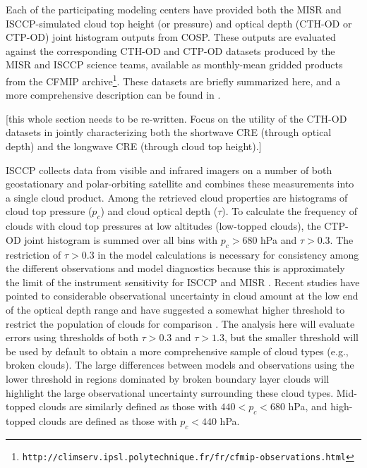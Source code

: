 Each of the participating modeling centers have provided both the MISR and ISCCP-simulated cloud top height (or pressure) and optical depth (CTH-OD or CTP-OD) joint histogram outputs from COSP. These outputs are evaluated against the corresponding CTH-OD and CTP-OD datasets produced by the MISR and ISCCP science teams, available as monthly-mean gridded products from the CFMIP archive\footnote{\tt http://climserv.ipsl.polytechnique.fr/fr/cfmip-observations.html}. These datasets are briefly summarized here, and a more comprehensive description can be found in \cite{marchand_et_al_2010}.

[this whole section needs to be re-written. Focus on the utility of the CTH-OD datasets in jointly characterizing both the shortwave CRE (through optical depth) and the longwave CRE (through cloud top height).]

ISCCP collects data from visible and infrared imagers on a number of both geostationary and polar-orbiting satellite and combines these measurements into a single cloud product. Among the retrieved cloud properties are histograms of cloud top pressure ($p_c$) and cloud optical depth ($\tau$). To calculate the frequency of clouds with cloud top pressures at low altitudes (low-topped clouds), the CTP-OD joint histogram is summed over all bins with $p_c > 680$ hPa and $\tau > 0.3$. The restriction of $\tau > 0.3$ in the model calculations is necessary for consistency among the different observations and model diagnostics because this is approximately the limit of the instrument sensitivity for ISCCP and MISR \citep{marchand_et_al_2010}. Recent studies have pointed to considerable observational uncertainty in cloud amount at the low end of the optical depth range and have suggested a somewhat higher threshold to restrict the population of clouds for comparison \citep[e.g.,][]{pincus_et_al_2012, zhao_and_digirolamo_2006}. The analysis here will evaluate errors using thresholds of both $\tau > 0.3$ and $\tau > 1.3$, but the smaller threshold will be used by default to obtain a more comprehensive sample of cloud types (e.g., broken clouds). The large differences between models and observations using the lower threshold in regions dominated by broken boundary layer clouds will highlight the large observational uncertainty surrounding these cloud types. Mid-topped clouds are similarly defined as those with $440 < p_c < 680$ hPa, and high-topped clouds are defined as those with $p_c < 440$ hPa.

